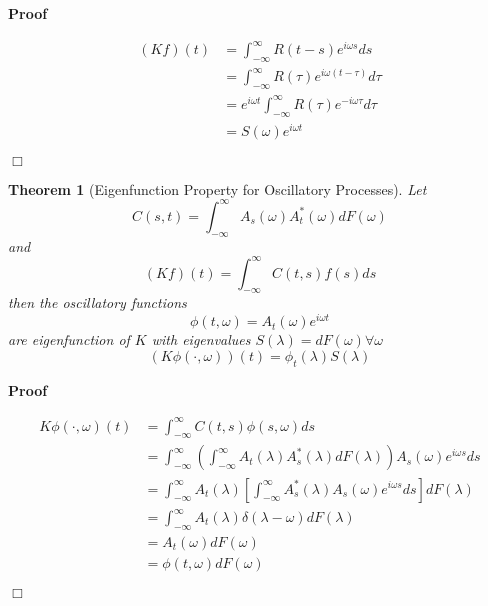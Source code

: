 \documentclass{article}
\newcommand{\cdummy}{\cdot}
\newenvironment{proof}{\noindent\textbf{Proof\ }}{\hspace*{\fill}$\Box$\medskip}
\newtheorem{theorem}{Theorem}
\begin{document}
\begin{proof}
  
  \begin{equation}
    \begin{array}{ll}
      (Kf) (t) & = \int_{- \infty}^{\infty} R (t - s) e^{i \omega s} ds\\
      & = \int_{- \infty}^{\infty} R (\tau) e^{i \omega (t - \tau)} d \tau\\
      & = e^{i \omega t}  \int_{- \infty}^{\infty} R (\tau) e^{- i \omega
      \tau} d \tau\\
      & = S (\omega) e^{i \omega t}
    \end{array}
  \end{equation}
  
\end{proof}

\begin{theorem}[Eigenfunction Property for Oscillatory Processes]
  Let
  \begin{equation}
    C (s, t) = \int_{- \infty}^{\infty} A_s (\omega) A_t^{\ast} (\omega) dF
    (\omega)
  \end{equation}
  and
  \begin{equation}
    (Kf) (t) = \int_{- \infty}^{\infty} C (t, s) f (s) ds
  \end{equation}
  then the oscillatory functions
  \begin{equation}
    \phi (t, \omega) = A_t (\omega) e^{i \omega t}
  \end{equation}
  are eigenfunction of $K$ with eigenvalues $S (\lambda) = dF (\omega) \forall
  \omega$
  \begin{equation}
    (K \phi (\cdummy, \omega)) (t) = \phi_t (\lambda) S (\lambda)
  \end{equation}
\end{theorem}

\begin{proof}
  
  \begin{equation}
    \begin{array}{ll}
      K \phi (\cdummy, \omega) (t) & = \int_{- \infty}^{\infty} C (t, s) \phi
      (s, \omega) ds\\
      & = \int_{- \infty}^{\infty} \left( \int_{- \infty}^{\infty} A_t
      (\lambda) A_s^{\ast} (\lambda) dF (\lambda) \right) A_s (\omega) e^{i
      \omega s} ds\\
      & = \int_{- \infty}^{\infty} A_t (\lambda) \left[ \int_{-
      \infty}^{\infty} A_s^{\ast} (\lambda) A_s (\omega) e^{i \omega s} ds
      \right] dF (\lambda)\\
      & = \int_{- \infty}^{\infty} A_t (\lambda) \delta (\lambda - \omega) dF
      (\lambda)\\
      & = A_t (\omega) dF (\omega)\\
      & = \phi (t, \omega) dF (\omega)
    \end{array}
  \end{equation}
  
\end{proof}
\end{document}
